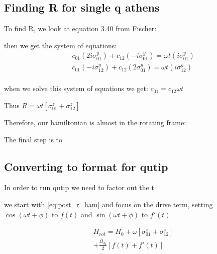 \documentclass[12pt]{article}
\begin{document}
\subsection{Finding R for single q athens}
To find R, we look at equation 3.40 from Fischer: 
\begin{equation}
        [R, \sigma^x_{nn'} = \omega t(i \omega^y_{nn'})]
\end{equation}

then we get the system of equations:
\begin{align}
        & c_{01}(2 i \sigma^y_{01}) + c_{12}(- i \sigma^y_{01}) = \omega t (i \sigma^y_{01})\\
        & c_{01}(- i \sigma^y_{12}) + c_{12}(2 \sigma^y_{01}) = \omega t (i \sigma^y_{12})\\
\end{align}

when we solve this system of equations we get:
$c_{01} = c_{12} \omega t$

Thus $R = \omega t \left[\sigma^z_{01} + \sigma^z_{12}\right]$




Therefore, our hamiltonian is almost in the rotating frame:

The final step is to 

\subsection{Converting to format for qutip}
In order to run qutip we need to factor out the t

we start with \eqref{eq:post_r_ham} and focus on the drive term, setting
$\cos{(\omega t + \phi)}$ to $f(t)$ and $\sin{(\omega t + \phi)}$ to $f'(t)$

\begin{equation}
\begin{split}
        & H_{rot} = H_0 + \omega \left[\sigma^z_{01} + \sigma^z_{12}\right] \\ 
        & + \frac{\Omega_{d_0}}{2} \left[ f(t) + f'(t) \right]
\end{split}
\end{equation}
\end{document}
